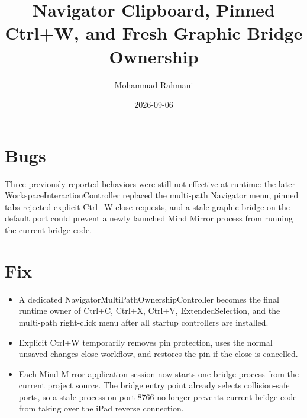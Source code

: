 \documentclass[a4paper]{article}
\title{Navigator Clipboard, Pinned Ctrl+W, and Fresh Graphic Bridge Ownership}
\date{2026-09-06}
\author{Mohammad Rahmani}
\begin{document}
   \maketitle

   \section{Bugs}
   Three previously reported behaviors were still not effective at runtime:
   the later WorkspaceInteractionController replaced the multi-path Navigator
   menu, pinned tabs rejected explicit Ctrl+W close requests, and a stale
   graphic bridge on the default port could prevent a newly launched Mind
   Mirror process from running the current bridge code.

   \section{Fix}
   \begin{itemize}
      \item A dedicated NavigatorMultiPathOwnershipController becomes the final
      runtime owner of Ctrl+C, Ctrl+X, Ctrl+V, ExtendedSelection, and the
      multi-path right-click menu after all startup controllers are installed.
      \item Explicit Ctrl+W temporarily removes pin protection, uses the normal
      unsaved-changes close workflow, and restores the pin if the close is
      cancelled.
      \item Each Mind Mirror application session now starts one bridge process
      from the current project source. The bridge entry point already selects
      collision-safe ports, so a stale process on port 8766 no longer prevents
      current bridge code from taking over the iPad reverse connection.
   \end{itemize}

   
   
\end{document}
